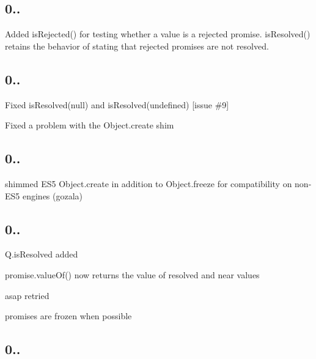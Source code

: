 \subsection*{0..}


\begin{DoxyItemize}
\item Added is\+Rejected() for testing whether a value is a rejected promise. is\+Resolved() retains the behavior of stating that rejected promises are not resolved.
\end{DoxyItemize}

\subsection*{0..}


\begin{DoxyItemize}
\item Fixed is\+Resolved(null) and is\+Resolved(undefined) \mbox{[}issue \#9\mbox{]}
\item Fixed a problem with the Object.\+create shim
\end{DoxyItemize}

\subsection*{0..}


\begin{DoxyItemize}
\item shimmed E\+S5 Object.\+create in addition to Object.\+freeze for compatibility on non-\/\+E\+S5 engines (gozala)
\end{DoxyItemize}

\subsection*{0..}


\begin{DoxyItemize}
\item Q.\+is\+Resolved added
\item promise.\+value\+Of() now returns the value of resolved and near values
\item asap retried
\item promises are frozen when possible
\end{DoxyItemize}

\subsection*{0..}


